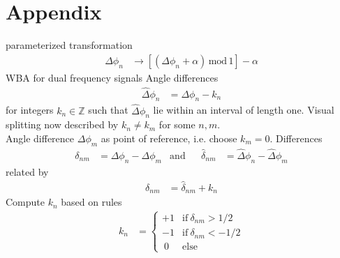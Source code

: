 \documentclass[english, parskip=full]{scrartcl}
\newcommand{\kla}{}
\newcommand{\klam}{}
\newcommand{\tecxt}{}
\begin{document}
\section{Appendix}
parameterized transformation
\begin{align*}
\Delta\phi_n&\longrightarrow\klam\left[ {\kla\left( {\Delta\phi_n+\alpha} \right)\,\tecxt\text{mod}\,1} \right]-\alpha
\end{align*}
WBA for dual frequency signals
Angle differences
\begin{align*}
\hat{\Delta}\phi_n&=\Delta\phi_n -k_n
\end{align*}
for integers $k_n\in\mathbb{Z}$ such that
$\hat{\Delta}\phi_n$ lie within an interval of length one.
Visual splitting now described by $k_n\neq k_m$ for some $n,m$.
\\
Angle difference $\Delta\phi_m$ as point of reference, i.e. choose $k_m=0$.
Differences
\begin{align*}
\delta_{nm}&=\Delta\phi_n - \Delta\phi_m&\tecxt\text{and}&&\hat{\delta}_{nm}&=\hat{\Delta}\phi_n - \hat{\Delta}\phi_m
\end{align*}
related by
\begin{align*}
\delta_{nm}&=\hat{\delta}_{nm}+k_n
\end{align*}
Compute $k_n$ based on rules
\begin{align*}
k_n&=\begin{cases}
+1&\tecxt\text{if}\ \delta_{nm}>1/2 \\
-1&\tecxt\text{if}\ \delta_{nm}<-1/2 \\
\ 0 &\tecxt\text{else}
\end{cases}
\end{align*}
\end{document}
